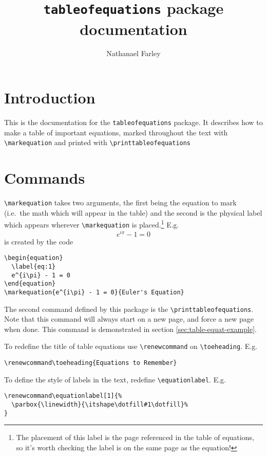 \documentclass{article}
\begin{document}
\title{\texttt{tableofequations} package documentation}
\author{Nathanael Farley}
\maketitle

\section{Introduction}
\label{sec:introduction}

This is the documentation for the \verb=tableofequations= package. It describes how to make a table of important equations, marked throughout the text with \verb=\markequation= and printed with \verb=\printtableofequations=

\section{Commands}
\label{sec:commands}

\verb=\markequation= takes two arguments, the first being the equation to mark (i.e.\ the math which will appear in the table) and the second is the physical label which appears wherever \verb=\markequation= is placed.\footnote{The placement of this label is the page referenced in the table of equations, so it's worth checking the label is on the same page as the equation!} E.g.\  
\begin{equation}
  \label{eq:1}
  e^{i\pi} - 1 = 0
\end{equation}
is created by the code
\begin{verbatim}
\begin{equation}
  \label{eq:1}
  e^{i\pi} - 1 = 0
\end{equation}
\markequation{e^{i\pi} - 1 = 0}{Euler's Equation}
\end{verbatim}

The second command defined by this package is the \verb=\printtableofequations=. Note that this command will always start on a new page, and force a new page when done. This command is demonstrated in section \ref{sec:table-equat-example}.

To redefine the title of table equations use \verb=\renewcommand= on \verb=\toeheading=. E.g.
\begin{verbatim}
\renewcommand\toeheading{Equations to Remember}
\end{verbatim}

To define the style of labels in the text, redefine \verb=\equationlabel=. E.g.
\begin{verbatim}
\renewcommand\equationlabel[1]{%
  \parbox{\linewidth}{\itshape\dotfill#1\dotfill}%
}
\end{verbatim}
\end{document}
